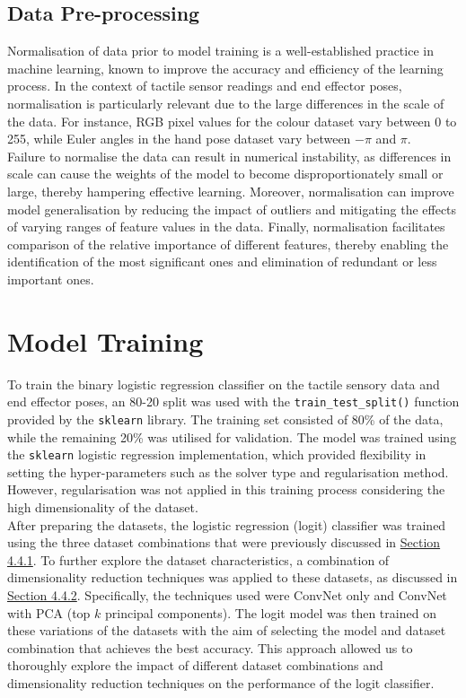 \documentclass[11pt, a4paper]{report}
\begin{document}
\subsection{Data Pre-processing}\label{sec:4.4.3}
Normalisation of data prior to model training is a well-established practice in machine learning, known to improve the accuracy and efficiency of the learning process. In the context of tactile sensor readings and end effector poses, normalisation is particularly relevant due to the large differences in the scale of the data. For instance, RGB pixel values for the colour dataset vary between 0 to 255, while Euler angles in the hand pose dataset vary between $-\pi$ and $\pi$.\\

Failure to normalise the data can result in numerical instability, as differences in scale can cause the weights of the model to become disproportionately small or large, thereby hampering effective learning. Moreover, normalisation can improve model generalisation by reducing the impact of outliers and mitigating the effects of varying ranges of feature values in the data. Finally, normalisation facilitates comparison of the relative importance of different features, thereby enabling the identification of the most significant ones and elimination of redundant or less important ones.


\section{Model Training}\label{sec:4.5}
To train the binary logistic regression classifier on the tactile sensory data and end effector poses, an 80-20 split was used with the \verb|train_test_split()| function provided by the \verb|sklearn| library. The training set consisted of 80\% of the data, while the remaining 20\% was utilised for validation. The model was trained using the \verb|sklearn| logistic regression implementation, which provided flexibility in setting the hyper-parameters such as the solver type and regularisation method. However, regularisation was not applied in this training process considering the high dimensionality of the dataset.\\

After preparing the datasets, the logistic regression (logit) classifier was trained using the three dataset combinations that were previously discussed in \hyperref[sec:4.4.1]{Section 4.4.1}. To further explore the dataset characteristics, a combination of dimensionality reduction techniques was applied to these datasets, as discussed in \hyperref[sec:4.4.2]{Section 4.4.2}. Specifically, the techniques used were ConvNet only and ConvNet with PCA (top $k$ principal components). The logit model was then trained on these variations of the datasets with the aim of selecting the model and dataset combination that achieves the best accuracy. This approach allowed us to thoroughly explore the impact of different dataset combinations and dimensionality reduction techniques on the performance of the logit classifier.
\end{document}
